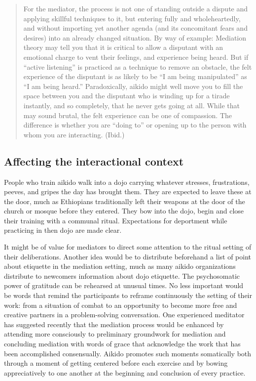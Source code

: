 \begin{quote}
For the mediator, the process is not one of standing outside a dispute and applying skillful techniques to it, but entering fully and wholeheartedly, and without importing yet another agenda (and its concomitant fears and desires) into an already changed situation. By way of example: Mediation theory may tell you that it is critical to allow a disputant with an emotional charge to vent their feelings, and experience being heard. But if ``active listening'' is practiced as a technique to remove an obstacle, the felt experience of the disputant is as likely to be ``I am being manipulated'' as ``I am being heard.'' Paradoxically, aikido might well move you to fill the space between you and the disputant who is winding up for a tirade instantly, and so completely, that he never gets going at all. While that may sound brutal, the felt experience can be one of compassion. The difference is whether you are ``doing to'' or opening up to the person with whom you are interacting. (Ibid.)
\end{quote}

\subsection*{Affecting the interactional context}

People who train aikido walk into a dojo carrying whatever stresses, frustrations, peeves, and gripes the day has brought them. They are expected to leave these at the door, much as Ethiopians traditionally left their weapons at the door of the church or mosque before they entered. They bow into the dojo, begin and close their training with a communal ritual. Expectations for deportment while practicing in then dojo are made clear.

It might be of value for mediators to direct some attention to the ritual setting of their deliberations. Another idea would be to distribute beforehand a list of point about etiquette in the mediation setting, much as many aikido organizations distribute to newcomers information about dojo etiquette. The psychosomatic power of gratitude can be rehearsed at unusual times. No less important would be words that remind the participants to reframe continuously the setting of their work: from a situation of combat to an opportunity to become more free and creative partners in a problem-solving conversation. One experienced meditator has suggested recently that the mediation process would be enhanced by attending more consciously to preliminary groundwork for mediation and concluding mediation with words of grace that acknowledge the work that has been accomplished consensually. Aikido promotes such moments somatically both through a moment of getting centered before each exercise and by bowing appreciatively to one another at the beginning and conclusion of every practice. 

